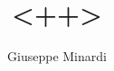 \documentclass[11pt, onecolumn, twoside]{article}
\title{<++>}
\author{Giuseppe Minardi}
\begin{document}
\sloppy
\maketitle

\tableofcontents
\end{document}
